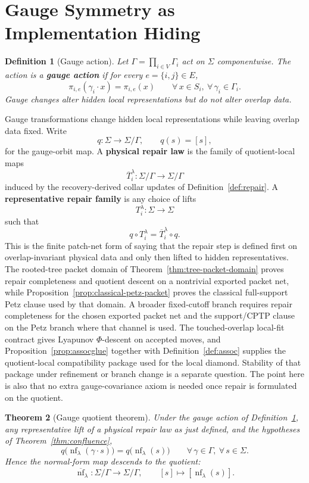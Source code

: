 \documentclass[11pt]{article}
\newtheorem{theorem}{Theorem}[section]
\newtheorem{definition}[theorem]{Definition}
\theoremstyle{remark}
\theoremstyle{plain}
\begin{document}
\section{Gauge Symmetry as Implementation Hiding}

\begin{definition}[Gauge action]\label{def:gauge}
Let $\Gamma = \prod_{i\in V}\Gamma_i$ act on $\Sigma$ componentwise. The action is a \textbf{gauge action} if for every $e=\{i,j\}\in E$,
\[
\pi_{i,e}(\gamma_i\cdot x)=\pi_{i,e}(x)
\qquad
\forall\, x\in S_i,\ \forall\, \gamma_i\in \Gamma_i.
\]
Gauge changes alter hidden local representations but do not alter overlap data.
\end{definition}

Gauge transformations change hidden local representations while leaving overlap data fixed. Write
\[
q:\Sigma\to \Sigma/\Gamma,
\qquad
q(s)=[s],
\]
for the gauge-orbit map. A \textbf{physical repair law} is the family of quotient-local maps
\[
\overline T_i^\lambda:\Sigma/\Gamma\to \Sigma/\Gamma
\]
induced by the recovery-derived collar updates of Definition~\ref{def:repair}. A
\textbf{representative repair family} is any choice of lifts
\[
T_i^\lambda:\Sigma\to\Sigma
\]
such that
\[
q\circ T_i^\lambda
=
\overline T_i^\lambda\circ q.
\]
This is the finite patch-net form of saying that the repair step is defined first on
overlap-invariant physical data and only then lifted to hidden representatives. The rooted-tree
packet domain of Theorem~\ref{thm:tree-packet-domain} proves repair completeness and quotient
descent on a nontrivial exported packet net, while Proposition~\ref{prop:classical-petz-packet}
proves the classical full-support Petz clause used by that domain. A broader fixed-cutoff
branch requires repair completeness for the chosen exported packet net and the
support/CPTP clause on the Petz branch where that channel is used. The touched-overlap local-fit contract gives Lyapunov \(\Phi\)-descent on
accepted moves, and Proposition~\ref{prop:assocglue} together with
Definition~\ref{def:assoc} supplies the quotient-local compatibility package used for the local
diamond. Stability of that package under refinement or branch change is a separate question.
The point here is also that no extra gauge-covariance axiom is needed once repair is formulated
on the quotient.

\begin{theorem}[Gauge quotient theorem]\label{thm:gauge}
Under the gauge action of Definition~\ref{def:gauge}, any representative lift of a physical repair
law as just defined, and the hypotheses of Theorem~\ref{thm:confluence},
\[
q\bigl(\operatorname{nf}_\lambda(\gamma\cdot s)\bigr)
=
q\bigl(\operatorname{nf}_\lambda(s)\bigr)
\qquad
\forall\, \gamma\in\Gamma,\ \forall\, s\in\Sigma.
\]
Hence the normal-form map descends to the quotient:
\[
\overline{\operatorname{nf}}_\lambda:\Sigma/\Gamma \to \Sigma/\Gamma,
\qquad
[s]\mapsto [\operatorname{nf}_\lambda(s)].
\]
\end{theorem}
\end{document}
